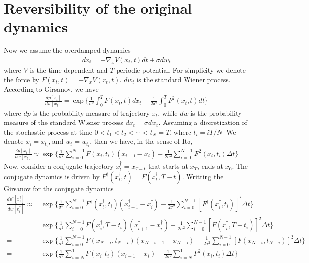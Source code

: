 \documentclass[aps, pre, preprint,unsortedaddress,a4paper,onecolumn]{revtex4-1}
\newcommand{\dt}[0]{\Delta t}
\begin{document}
\section{Reversibility of the original dynamics}

Now we assume the overdamped dynamics
\begin{align}\label{eqn:tmp7}
  dx_t = -\nabla_x V(x_t,t) dt + \sigma dw_t
\end{align}
where $V$ is the time-dependent and $T$-periodic potential. For simplicity we denote the force by $F(x_t,t) = -\nabla_x V(x_t, t)$. $dw_t$ is
the standard Wiener process.
According to Girsanov, we have
\begin{align}
  \label{eq:tmp8}
  \frac{dp[x_t]}{dw[x_t]}  =
  \exp \bigg\{
  \frac 1{\sigma^2}\int_0^T F(x_t,t) dx_t -
  \frac1{2\sigma^2}\int_0^T F^2(x_t,t) dt
  \bigg\}
\end{align}
where $dp$ is the probability measure of trajectory $x_t$, while $dw$ is the
probability measure of the standard Wiener process $dx_t = \sigma dw_t$.
Assuming a discretization of the
stochastic process at time $0 < t_1 < t_2 < \cdots < t_N = T$, where
$t_i = iT / N$. We denote $x_i = x_{t_i}$, and $w_i = w_{t_i}$, then we have,
in the sense of Ito,
\begin{align}\label{eq:tmp9}
  \frac{dp[x_t]}{dw[x_t]}  \approx
  \exp\bigg\{\frac1{\sigma^2}\sum_{i=0}^{N-1} F(x_{i},t_{i})(x_{i+1} - x_i) -\frac1{2\sigma^2}\sum_{i=0}^{N-1}F^2(x_i,t_i)\dt\bigg\} 
\end{align}
Now, consider a conjugate trajectory $x^\dagger_t = x_{T-t}$ that starts at $x_T$, ends at $x_0$. The conjugate dynamics is driven by  $F^\dagger(x^\dagger_t,t) = F(x^\dagger_t, T-t)$.
Writting the Girsanov for the conjugate dynamics
\begin{align}\label{eq:dagger-0}
  \frac{dp^\dagger[x^\dagger_t]}{dw[x^\dagger_t]}  
  \approx\,&
  \exp\bigg\{
  \frac1{\sigma^2}\sum_{i=0}^{N-1} F^\dagger(x^\dagger_{i},t_{i})(x^\dagger_{i+1} - x^\dagger_i) -
  \frac1{2\sigma^2}\sum_{i=0}^{N-1}[F^\dagger(x^\dagger_i,t_i)]^2\dt\bigg\} \\ \nonumber
  =\,&
  \exp\bigg\{
  \frac1{\sigma^2}\sum_{i=0}^{N-1} F(x^\dagger_{i},T - t_{i})(x^\dagger_{i+1} - x^\dagger_i) -
  \frac1{2\sigma^2}\sum_{i=0}^{N-1}[F(x^\dagger_i, T-t_i)]^2\dt\bigg\} \\\nonumber
  =\,&
  \exp\bigg\{
  \frac1{\sigma^2}\sum_{i=0}^{N-1} F(x_{N-i},t_{N-i})(x_{N-i-1} - x_{N-i}) -
  \frac1{2\sigma^2}\sum_{i=0}^{N-1}[F(x_{N-i},t_{N-i})]^2\dt\bigg\} \\
  = \,&
  \exp\bigg\{
  \frac1{\sigma^2}\sum_{i=N}^{1} F(x_{i},t_{i})(x_{i-1} - x_i) -
  \frac1{2\sigma^2}\sum_{i=N}^{1}F^2(x_i,t_i)\dt\bigg\}
\end{align}
\end{document}
